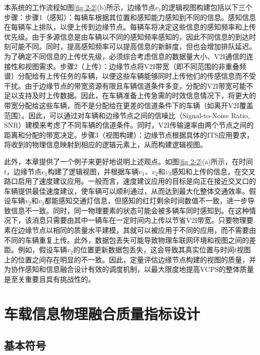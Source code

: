 本系统的工作流程如图\ref{fig 2-2}(b)所示，边缘节点$e_1$的逻辑视图构建包括以下三个步骤：步骤1（感知）：每辆车根据其位置和感知能力感知到不同的信息。感知信息在每辆车上排队，以便上传到边缘节点。每辆车将决定这些信息的感知频率和上传优先级。由于多源信息是由车辆以不同的感知频率感知的，因此不同信息的到达时刻可能不同。同时，提高感知频率可以提高信息的新鲜度，但也会增加排队延迟。为了确定不同信息的上传优先级，必须综合考虑信息的数据量大小、V2I通信的连接性和视图需求。步骤2（上传）：边缘节点将V2I带宽（即不同范围的非重叠频谱）分配给有上传任务的车辆，以便这些车辆能够同时上传他们的传感信息而不受干扰。由于边缘节点的带宽资源有限且车辆信道条件多变，分配的V2I带宽可能不足以支持及时上传数据。因此，在车辆准备上传急需的时效信息情况下，将更大的带宽分配给这些车辆，而不是分配给在更差的信道条件下的车辆（如离开V2I覆盖范围）。因此，可以通过对车辆和边缘节点之间的信噪比（Signal-to-Noise Ratio, SNR）建模来考虑了不同车辆的信道条件。同时，V2I传输速率由两个节点之间的距离和分配的带宽决定。步骤3（视图构建）：边缘节点根据具体的ITS应用要求，将收到的物理信息映射到相应的逻辑元素上，从而构建逻辑视图。

此外，本章提供了一个例子来更好地说明上述观点。如图\ref{fig 2-2}(a)所示，在时间 $t$，边缘节点$e_1$构建了逻辑视图，并根据车辆$v_1$、$v_2$和$v_3$感知和上传的信息，在交叉路口启用了速度建议应用。一般而言，速度建议应用的目标是向正在接近交叉口的车辆提供最佳速度建议，使车辆可以顺利通过，从而达到最大化整体交通效率。假设车辆$v_2$和$v_3$都能感知交通灯信息，但感知的红灯剩余时间数值不一致，进一步导致信息不一致。同时，同一物理要素的状态可能会被多辆车同时感知到。在这种情况下，该消息只需要由其中一辆车在一定时间内上传以节省V2I带宽。只要物理要素在边缘节点以相同的质量水平建模，其就可以被应用于不同的应用，而不需要由不同的车辆重复上传。此外，数据包丢失可能导致物理车联网环境和视图之间的差距。例如，假设车辆$v_2$的位置更新数据包丢失，这会导致其真实位置与时间$t$视图上的位置之间存在明显的不一致。因此，定量评估边缘节点构建的视图的质量，并为协作感知和信息融合设计有效的调度机制，以最大限度地提高VCPS的整体质量是至关重要且具有挑战性的。

\section[\hspace{-2pt}车载信息物理融合质量指标设计]{{ \hspace{-8pt}车载信息物理融合质量指标设计}}\label{section 2-4}

\subsection[\hspace{-2pt}基本符号]{{ \hspace{-8pt}基本符号}}

